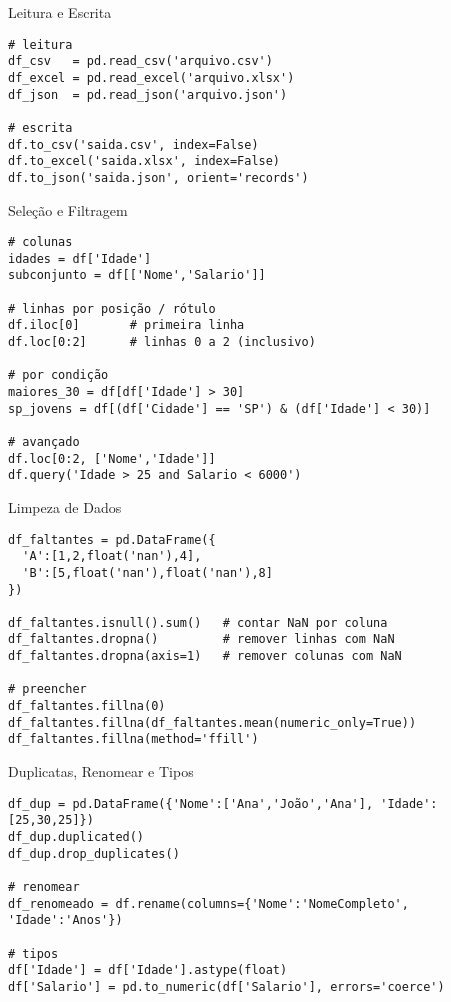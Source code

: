 \documentclass[aspectratio=169]{beamer}
\begin{document}
\begin{frame}[fragile]{Leitura e Escrita}
\begin{lstlisting}
# leitura
df_csv   = pd.read_csv('arquivo.csv')
df_excel = pd.read_excel('arquivo.xlsx')
df_json  = pd.read_json('arquivo.json')

# escrita
df.to_csv('saida.csv', index=False)
df.to_excel('saida.xlsx', index=False)
df.to_json('saida.json', orient='records')
\end{lstlisting}
\end{frame}

\begin{frame}[fragile]{Seleção e Filtragem}
\begin{lstlisting}
# colunas
idades = df['Idade']
subconjunto = df[['Nome','Salario']]

# linhas por posição / rótulo
df.iloc[0]       # primeira linha
df.loc[0:2]      # linhas 0 a 2 (inclusivo)

# por condição
maiores_30 = df[df['Idade'] > 30]
sp_jovens = df[(df['Cidade'] == 'SP') & (df['Idade'] < 30)]

# avançado
df.loc[0:2, ['Nome','Idade']]
df.query('Idade > 25 and Salario < 6000')
\end{lstlisting}
\end{frame}

\begin{frame}[fragile]{Limpeza de Dados}
\begin{lstlisting}
df_faltantes = pd.DataFrame({
  'A':[1,2,float('nan'),4],
  'B':[5,float('nan'),float('nan'),8]
})

df_faltantes.isnull().sum()   # contar NaN por coluna
df_faltantes.dropna()         # remover linhas com NaN
df_faltantes.dropna(axis=1)   # remover colunas com NaN

# preencher
df_faltantes.fillna(0)
df_faltantes.fillna(df_faltantes.mean(numeric_only=True))
df_faltantes.fillna(method='ffill')
\end{lstlisting}
\end{frame}

\begin{frame}[fragile]{Duplicatas, Renomear e Tipos}
\begin{lstlisting}
df_dup = pd.DataFrame({'Nome':['Ana','João','Ana'], 'Idade':[25,30,25]})
df_dup.duplicated()
df_dup.drop_duplicates()

# renomear
df_renomeado = df.rename(columns={'Nome':'NomeCompleto', 'Idade':'Anos'})

# tipos
df['Idade'] = df['Idade'].astype(float)
df['Salario'] = pd.to_numeric(df['Salario'], errors='coerce')
\end{lstlisting}
\end{frame}
\end{document}
